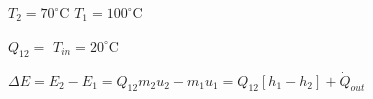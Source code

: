 \( T_2 = 70^\circ \text{C} \)  
\( T_1 = 100^\circ \text{C} \)  

\( Q_{12} = \)  
\( T_{in} = 20^\circ \text{C} \)  

\( \Delta E = E_2 - E_1 = Q_{12} m_2 u_2 - m_1 u_1 = Q_{12} [h_1 - h_2] + \dot{Q}_{out} \)